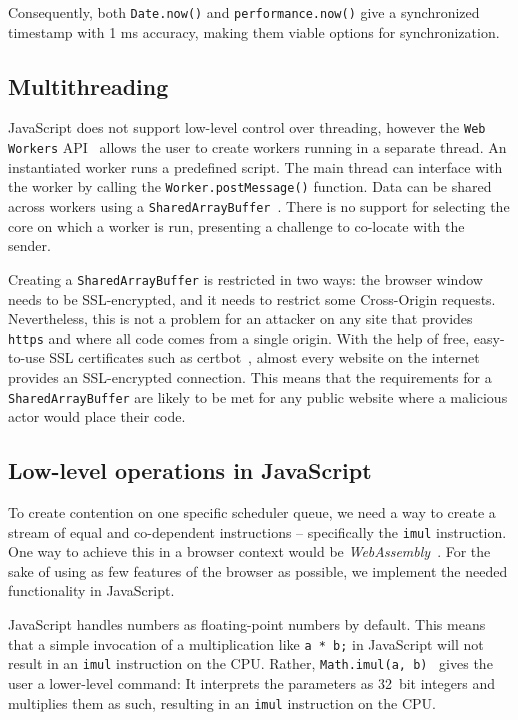 \documentclass[11pt,
  titlepage=false,
  parskip=half,      %
]{scrreprt}
\begin{document}
Consequently, both \texttt{Date.now()} and \texttt{performance.now()} give a synchronized timestamp with 1 ms accuracy, making them viable options for synchronization.

\subsection{Multithreading}\label{subsec:multithreading}
JavaScript does not support low-level control over threading, however the \texttt{Web Workers} API~\cite{webworkers} allows the user to create workers running in a separate thread.
An instantiated worker runs a predefined script.
The main thread can interface with the worker by calling the \texttt{Worker.postMessage()} function.
Data can be shared across workers using a \texttt{SharedArrayBuffer}~\cite{sharedarraybuffer}.
There is no support for selecting the core on which a worker is run, presenting a challenge to co-locate with the sender.

Creating a \texttt{SharedArrayBuffer} is restricted in two ways: the browser window needs to be SSL-encrypted, and it needs to restrict some Cross-Origin requests.
Nevertheless, this is not a problem for an attacker on any site that provides \texttt{https} and where all code comes from a single origin.
With the help of free, easy-to-use SSL certificates such as certbot~\cite{certbot}, almost every website on the internet provides an SSL-encrypted connection.
This means that the requirements for a \texttt{SharedArrayBuffer} are likely to be met for any public website where a malicious actor would place their code.

\subsection{Low-level operations in JavaScript}\label{subsec:lowleveljs}
To create contention on one specific scheduler queue, we need a way to create a stream of equal and co-dependent instructions -- specifically the \texttt{imul} instruction.
One way to achieve this in a browser context would be \textit{WebAssembly}~\cite{webassembly}.
For the sake of using as few features of the browser as possible, we implement the needed functionality in JavaScript.

JavaScript handles numbers as floating-point numbers by default.
This means that a simple invocation of a multiplication like \texttt{a * b;} in JavaScript will not result in an \texttt{imul} instruction on the CPU.
Rather, \texttt{Math.imul(a, b)}~\cite{mathimul} gives the user a lower-level command:
It interprets the parameters as 32~bit integers and multiplies them as such, resulting in an \texttt{imul} instruction on the CPU.
\end{document}
